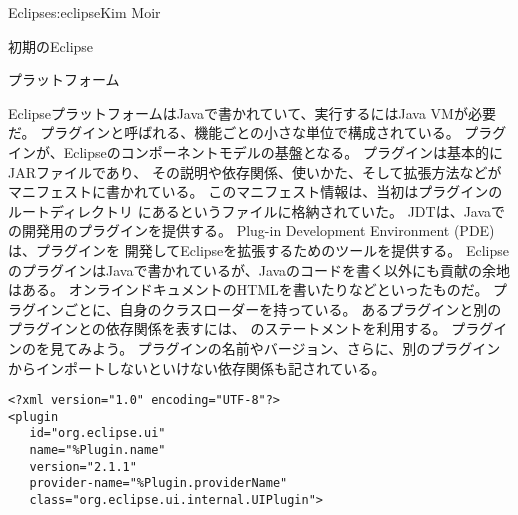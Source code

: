 \begin{aosachapter}{Eclipse}{s:eclipse}{Kim Moir}
\begin{aosasect1}{初期のEclipse}
\begin{aosasect2}{プラットフォーム}

EclipseプラットフォームはJavaで書かれていて、実行するにはJava VMが必要だ。
プラグインと呼ばれる、機能ごとの小さな単位で構成されている。
プラグインが、Eclipseのコンポーネントモデルの基盤となる。
プラグインは基本的にJARファイルであり、
その説明や依存関係、使いかた、そして拡張方法などがマニフェストに書かれている。
このマニフェスト情報は、当初はプラグインのルートディレクトリ
にあるというファイルに格納されていた。
JDTは、Javaでの開発用のプラグインを提供する。
Plug-in Development Environment (PDE)は、プラグインを
開発してEclipseを拡張するためのツールを提供する。
EclipseのプラグインはJavaで書かれているが、Javaのコードを書く以外にも貢献の余地はある。
オンラインドキュメントのHTMLを書いたりなどといったものだ。
プラグインごとに、自身のクラスローダーを持っている。
あるプラグインと別のプラグインとの依存関係を表すには、
のステートメントを利用する。
プラグインのを見てみよう。
プラグインの名前やバージョン、さらに、別のプラグインからインポートしないといけない依存関係も記されている。

\begin{verbatim}
<?xml version="1.0" encoding="UTF-8"?>
<plugin
   id="org.eclipse.ui"
   name="%Plugin.name"
   version="2.1.1"
   provider-name="%Plugin.providerName"
   class="org.eclipse.ui.internal.UIPlugin">


\end{verbatim}
\end{aosasect2}
\end{aosasect1}
\end{aosachapter}
